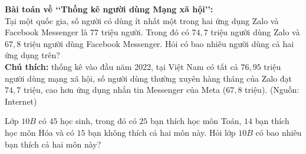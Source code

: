 \begin{bt}%
	\textbf{Bài toán về \lq\lq Thống kê người dùng Mạng xã hội\rq\rq:}\\
	Tại một quốc gia, số người có dùng ít nhất một trong hai ứng dụng Zalo và Facebook Messenger là $77$ triệu người. Trong đó có $74{,}7$ triệu người dùng Zalo và $67{,}8$ triệu người dùng Facebook Messenger. Hỏi có bao nhiêu người dùng cả hai ứng dụng trên?\\
	\textbf{Chú thích:} thống kê vào đầu năm 2022, tại Việt Nam có tất cả $76{,}95$ triệu người dùng mạng xã hội, số người dùng thường xuyên hàng tháng của Zalo đạt $74{,}7$ triệu, cao hơn ứng dụng nhắn tin Messenger của Meta ($67{,}8$ triệu). (Nguồn: Internet)
\end{bt}

\begin{bt}%
Lớp $ 10B $	 có $ 45$ học sinh, trong đó có $ 25 $ bạn thích học môn Toán, $ 14 $ bạn thích học môn Hóa và có $ 15 $ bạn không thích cả hai môn này. Hỏi lớp $ 10B $ có bao nhiêu bạn thích cả hai môn này?
\end{bt}

